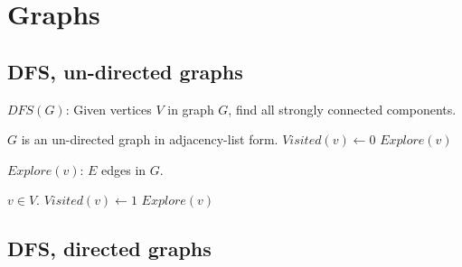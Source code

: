 \documentclass{article}
\begin{document}
	
\listofalgorithms
\section{Graphs}
\subsection{DFS, un-directed graphs}

\begin{algorithm}
\caption{$DFS(G)$: Given vertices $V$ in graph $G$, find all strongly connected components.}
\begin{algorithmic}[1]
\REQUIRE $G$ is an un-directed graph in adjacency-list form.
\STATE $Visited(v) \gets 0$
\ENDFOR
{}
	\STATE $Explore(v)$
\ENDIF
\ENDFOR
\end{algorithmic}
\end{algorithm}

\begin{algorithm}
\caption{$Explore(v)$: $E$ edges in $G$.}
\begin{algorithmic}[1]
\REQUIRE $v \in V$.
\STATE $Visited(v) \gets 1$
	\STATE $Explore(v)$
\ENDIF
\ENDFOR
\end{algorithmic}
\end{algorithm}

\subsection{DFS, directed graphs}
\end{document}
